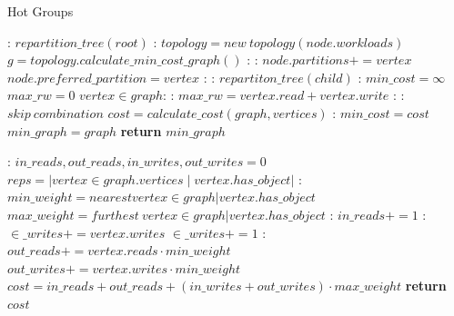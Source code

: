 \begin{algorithm}
  \caption{Hot Groups}\label{alg:hot-groups}
  \begin{algorithmic}[1]
  :
  \State $repartition\_tree(root)$
  \EndFunction
  :
      \State $topology = new\ topology(node.workloads)$
      \State $g = topology.calculate\_min\_cost\_graph()$
      :
        :
        \State $node.partitions += vertex$
            \State $node.preferred\_partition = vertex$
          \EndIf
        \EndIf
      \EndFor
    \EndIf
    :
      :
        \State $repartiton\_tree(child)$
        \EndFor
    \EndIf
    \EndFunction
    :
    \State $min\_cost = \infty$
    \State $max\_rw = 0$
    \For $vertex \in graph$:
      :
        \State $max\_rw = vertex.read + vertex.write$
      \EndIf
    \EndFor
    :
      :
          \State $skip\ combination$
        \EndIf
      \EndFor
      \State $cost = calculate\_cost(graph, vertices)$
      :
        \State $min\_cost = cost$
        \State $min\_graph = graph$
      \EndIf
    \EndFor
    \State \textbf{return} $min\_graph$
    \EndFunction

    :
      \State $in\_reads, out\_reads, in\_writes, out\_writes = 0$
      \State $reps = |vertex \in graph.vertices \mid vertex.has\_object|$
      :
      \State $min\_weight = nearest vertex \in graph | vertex.has\_object$
      \State $max\_weight = furthest\ vertex \in graph | vertex.has\_object$
        :
          \State $in\_reads+= 1$
          :
          \State $\in\_writes+= vertex.writes$
          \Else
          \State  $\in\_writes+= 1 $
          \EndIf
        \Else:
          \State $out\_reads += vertex.reads \cdot min\_weight$
          \State $out\_writes += vertex.writes \cdot min\_weight$
        \EndIf
      \EndFor
      \State $cost = in\_reads+ out\_reads + (in\_writes+ out\_writes) \cdot max\_weight$
      \State \textbf{return} $cost$
  \EndFunction
  \end{algorithmic}
  \end{algorithm}

